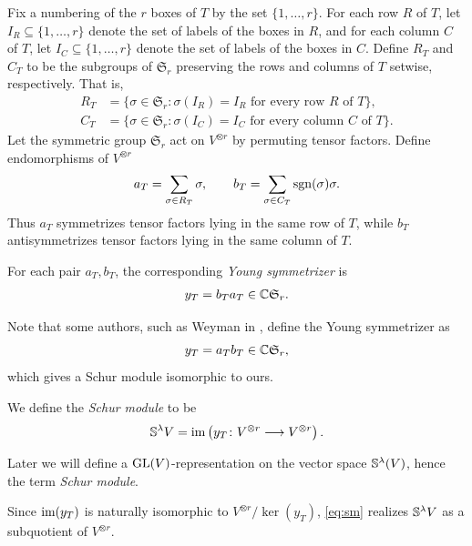 \documentclass[11pt]{amsart}
\begin{document}
\begin{defin}\label{def:ysds}
Fix a numbering of the $r$ boxes of $T$ by the set $\{1,\ldots,r\}$.
For each row $R$ of $T$, let $I_R\subseteq\{1,\ldots,r\}$ denote the
set of labels of the boxes in $R$, and for each column $C$ of $T$, let
$I_C\subseteq\{1,\ldots,r\}$ denote the set of labels of the boxes in $C$. Define  $R_T$ and $C_T$ to be the subgroups of $\mathfrak S_r$ preserving
the rows and columns of $T$ setwise, respectively. That is,
\begin{subequations}
\begin{align}
    R_T &= \{\sigma\in\mathfrak S_r : \sigma(I_R)=I_R
    \text{ for every row }R\text{ of }T\}, \\
    C_T &= \{\sigma\in\mathfrak S_r : \sigma(I_C)=I_C
    \text{ for every column }C\text{ of }T\}.
\end{align}
\end{subequations}
Let the symmetric group $\mathfrak S_r$ act on $V^{\otimes r}$ by
permuting tensor factors. Define endomorphisms of $V^{\otimes r}$
    \begin{align}
        a_T = \sum_{\sigma \in R_T} \sigma,
        \qquad
        b_T = \sum_{\sigma \in C_T} \mathrm{sgn}(\sigma)\sigma.
    \end{align}
Thus $a_T$ symmetrizes tensor factors lying in the same row of $T$, while $b_T$ antisymmetrizes tensor factors lying in the same column of $T$. 

For each pair $a_T, b_T$, the corresponding \emph{Young symmetrizer} is
    \begin{align}
         y_T = b_T a_T \in \mathbb{C} \mathfrak{S}_r.
    \end{align}
\end{defin}
Note that some authors, such as Weyman in \cite{Wey03}, define the Young symmetrizer as \[y_T = a_T b_T \in \mathbb{C} \mathfrak{S}_r,\] which gives a Schur module isomorphic to ours. 
\begin{defin}
    We define the \emph{Schur module} to be
    \begin{align}
        \mathbb{S}^\lambda V
        =
        \operatorname{im}\left(y_T \colon V^{\otimes r} \longrightarrow V^{\otimes r}\right). \label{eq:sm}
    \end{align}
\end{defin}

Later we will define a \(\mathrm{GL} (V)\)-representation on the vector space $\mathbb{S}^\lambda(V)$, hence the term \textit{Schur module}.

\begin{rem}
     Since $\operatorname{im}(y_T)$ is naturally isomorphic to $V^{\otimes r}/\ker(y_T)$, \cref{eq:sm} realizes $\mathbb{S}^\lambda V$ as a subquotient of $V^{\otimes r}$.
\end{rem}
\end{document}

